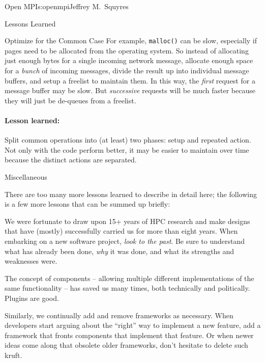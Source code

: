 \begin{aosachapter}{Open MPI}{s:openmpi}{Jeffrey M.\ Squyres}
\begin{aosasect1}{Lessons Learned}
\begin{aosasect2}{Optimize for the Common Case}
For example, {\tt malloc()} can be slow, especially if pages need to
be allocated from the operating system.  So instead of allocating just
enough bytes for a single incoming network message, allocate enough
space for a \emph{bunch} of incoming messages, divide the result up
into individual message buffers, and setup a freelist to maintain
them.  In this way, the \emph{first} request for a message buffer may
be slow.  But \emph{successive} requests will be much faster because
they will just be de-queues from a freelist.


\paragraph{Lesson learned:} Split common operations into (at least)
two phases: setup and repeated action.  Not only with the code perform
better, it may be easier to maintain over time because the distinct
actions are separated.

\end{aosasect2}


\begin{aosasect2}{Miscellaneous}

There are too many more lessons learned to describe in detail here;
the following is a few more lessons that can be summed up briefly:

\begin{aosaitemize}
\item We were fortunate to draw upon 15+ years of HPC research and
  make designs that have (mostly) successfully carried us for more
  than eight years.  When embarking on a new software project,
  \emph{look to the past}.  Be sure to understand what has already
  been done, \emph{why} it was done, and what its strengths and
  weaknesses were.

\item The concept of components -- allowing multiple different
  implementations of the same functionality -- has saved us many
  times, both technically and politically.  Plugins are good.

\item Similarly, we continually add and remove frameworks as
  necessary.  When developers start arguing about the ``right'' way to
  implement a new feature, add a framework that fronts components that
  implement that feature.  Or when newer ideas come along that
  obsolete older frameworks, don't hesitate to delete such kruft.


\end{aosaitemize}
\end{aosasect2}
\end{aosasect1}
\end{aosachapter}
